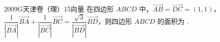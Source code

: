 
\begin{problem}{2009}{G}{天津卷（理）}{15}{向量}
在四边形 $ABCD$ 中，$\overrightarrow{AB}=\overrightarrow{DC}=(1,1)$，$\dfrac{1}{|\overrightarrow{BA}|}\overrightarrow{BA}+\dfrac{1}{|\overrightarrow{BC}|}\overrightarrow{BC}=\dfrac{\sqrt{3}}{|\overrightarrow{BD}|}\overrightarrow{BD}$，则四边形 $ABCD$ 的面积为 \underline{\hspace{4em}}.
\end{problem}

\begin{answer}

\end{answer}

\begin{solutions}

\end{solutions}